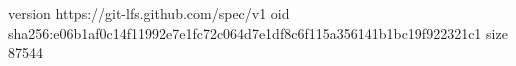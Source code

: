 version https://git-lfs.github.com/spec/v1
oid sha256:e06b1af0c14f11992e7e1fc72c064d7e1df8c6f115a356141b1bc19f922321c1
size 87544
